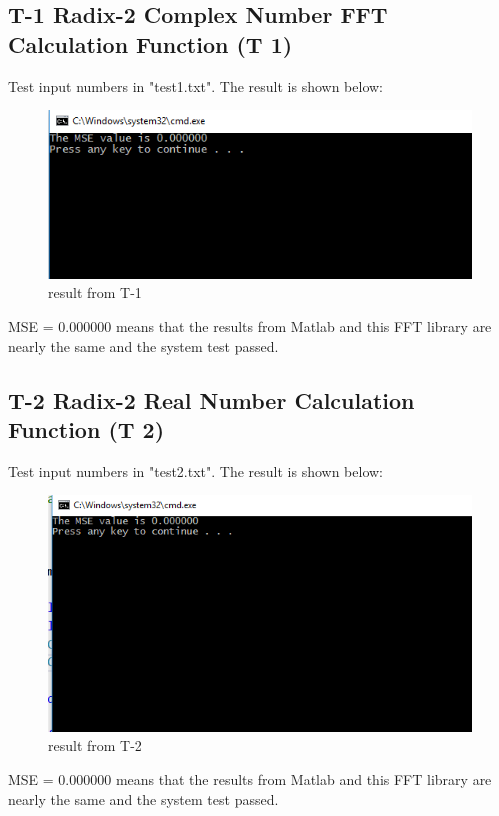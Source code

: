 \documentclass[12pt, titlepage]{article}
\begin{document}
\subsection {T-1 Radix-2 Complex Number FFT Calculation Function (T 1)}
Test input numbers in "test1.txt".  The result is shown below:\\
\begin{figure}[H]
 \includegraphics[width=\linewidth]{t1.PNG}
  \caption{result from T-1}
  \label{fig:T1}
\end{figure}
MSE = 0.000000 means that the results from Matlab and this FFT library are nearly the same and the system test passed.

\subsection {T-2 Radix-2 Real Number Calculation Function   (T 2)}
Test input numbers in "test2.txt".  The result is shown below:\\
\begin{figure}[H]
 \includegraphics[width=\linewidth]{t2.PNG}
  \caption{result from T-2}
  \label{fig:T2}
\end{figure}
MSE = 0.000000 means that the results from Matlab and this FFT library are nearly the same and the system test passed.
\end{document}
